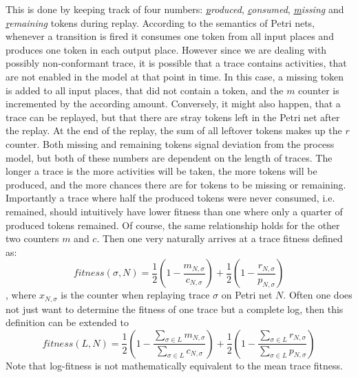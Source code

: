 \documentclass[runningheads]{template/llncs}
\begin{document}
This is done by keeping track of four numbers: \emph{\underline{p}roduced}, \emph{\underline{c}onsumed}, \emph{\underline{m}issing} and \emph{\underline{r}emaining} tokens during replay.
According to the semantics of Petri nets, whenever a transition is fired it consumes one token from all input places and produces one token in each output place.
However since we are dealing with possibly non-conformant trace, it is possible that a trace contains activities, that are not enabled in the model at that point in time.
In this case, a missing token is added to all input places, that did not contain a token, and the $m$ counter is incremented by the according amount.
Conversely, it might also happen, that a trace can be replayed, but that there are stray tokens left in the Petri net after the replay. 
At the end of the replay, the sum of all leftover tokens makes up the $r$ counter. 
Both missing and remaining tokens signal deviation from the process model, but both of these numbers are dependent on the length of traces.
The longer a trace is the more activities will be taken, the more tokens will be produced, and the more chances there are for tokens to be missing or remaining.
Importantly a trace where half the produced tokens were never consumed, i.e. remained, should intuitively have lower fitness than one where only a quarter of produced tokens remained.
Of course, the same relationship holds for the other two counters $m$ and $c$.
Then one very naturally arrives at a trace fitness defined as:
\begin{equation}
	fitness(\sigma,N) = \frac{1}{2}(1-\frac{m_{N,\sigma}}{c_{N,\sigma}})+\frac{1}{2}(1-\frac{r_{N,\sigma}}{p_{N,\sigma}})
\end{equation}
, where $x_{N,\sigma}$ is the counter when replaying trace $\sigma$ on Petri net $N$.
Often one does not just want to determine the fitness of one trace but a complete log, then this definition can be extended to 
\begin{equation}
	fitness(L,N) = \frac{1}{2}(1-\frac{\sum_{\sigma\in L}m_{N,\sigma}}{\sum_{\sigma\in L}c_{N,\sigma}})+\frac{1}{2}(1-\frac{\sum_{\sigma\in L}r_{N,\sigma}}{\sum_{\sigma\in L}p_{N,\sigma}})
\end{equation}
Note that log-fitness is not mathematically equivalent to the mean trace fitness.
\end{document}

